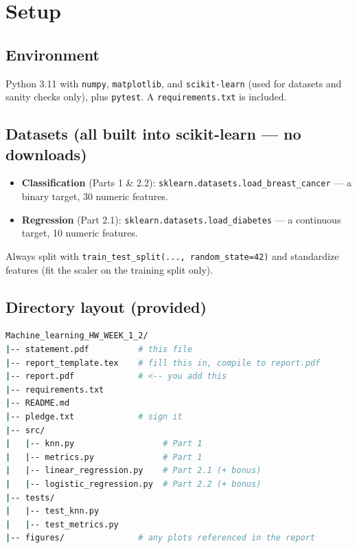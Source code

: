 \documentclass[11pt,a4paper]{article}
\begin{document}
\section{Setup}

\subsection{Environment}
Python 3.11 with \texttt{numpy}, \texttt{matplotlib}, and \texttt{scikit-learn} (used for datasets and sanity checks only), plus \texttt{pytest}. A \texttt{requirements.txt} is included.

\subsection{Datasets (all built into scikit-learn --- no downloads)}
\begin{itemize}[topsep=2pt,itemsep=1pt]
  \item \textbf{Classification} (Parts 1 \& 2.2): \texttt{sklearn.datasets.load\_breast\_cancer} --- a binary target, 30 numeric features.
  \item \textbf{Regression} (Part 2.1): \texttt{sklearn.datasets.load\_diabetes} --- a continuous target, 10 numeric features.
\end{itemize}
Always split with \texttt{train\_test\_split(..., random\_state=42)} and standardize features (fit the scaler on the training split only).

\subsection{Directory layout (provided)}
\begin{lstlisting}[style=python,language=bash,numbers=none,basicstyle=\ttfamily\small]
Machine_learning_HW_WEEK_1_2/
|-- statement.pdf          # this file
|-- report_template.tex    # fill this in, compile to report.pdf
|-- report.pdf             # <-- you add this
|-- requirements.txt
|-- README.md
|-- pledge.txt             # sign it
|-- src/
|   |-- knn.py                  # Part 1
|   |-- metrics.py              # Part 1
|   |-- linear_regression.py    # Part 2.1 (+ bonus)
|   |-- logistic_regression.py  # Part 2.2 (+ bonus)
|-- tests/
|   |-- test_knn.py
|   |-- test_metrics.py
|-- figures/               # any plots referenced in the report
\end{lstlisting}

\end{document}
